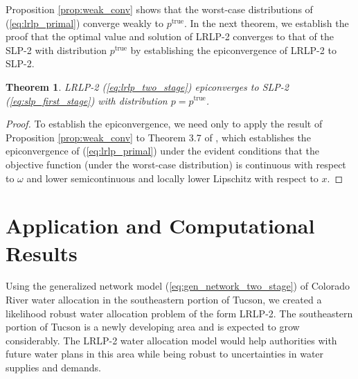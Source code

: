 \documentclass[11pt]{article}
\newcommand{\ptrue}{p^{\text{true}}}
\newtheorem{theorem}{Theorem}
\begin{document}
Proposition \ref{prop:weak_conv} shows that the worst-case distributions of (\ref{eq:lrlp_primal}) converge weakly to $\ptrue$.
In the next theorem, we establish the proof that the optimal value and solution of LRLP-2 converges to that of the SLP-2 with distribution $\ptrue$ by establishing the epiconvergence of LRLP-2 to SLP-2.
\begin{theorem}
	LRLP-2 (\ref{eq:lrlp_two_stage}) epiconverges to SLP-2 (\ref{eq:slp_first_stage}) with distribution $p = \ptrue$.
\end{theorem}

\begin{proof}
	To establish the epiconvergence, we need only to apply the result of Proposition \ref{prop:weak_conv} to Theorem 3.7 of \cite{dupacova1988asymptotic}, which establishes the epiconvergence of (\ref{eq:lrlp_primal}) under the evident conditions that the objective function (under the worst-case distribution) is continuous with respect to $\omega$ and lower semicontinuous and locally lower Lipschitz with respect to $x$.
\end{proof}

\section{Application and Computational Results} \label{sec:comp_results}

Using the generalized network model (\ref{eq:gen_network_two_stage}) of Colorado River water allocation in the southeastern portion of Tucson, we created a likelihood robust water allocation problem of the form LRLP-2.
The southeastern portion of Tucson is a newly developing area and is expected to grow considerably. 
The LRLP-2 water allocation model would help authorities with future water plans in this area while being robust to uncertainties in water supplies and demands.
\end{document}
